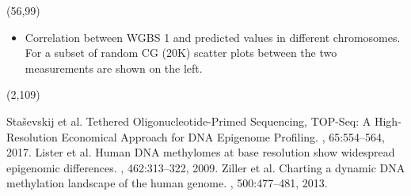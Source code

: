 \documentclass[a0,50pt]{a0poster}
\begin{document}
    \begin{textblock}{25}(56,99)
        \Large
        \begin{itemize}
            \item Correlation between WGBS 1 and predicted values in different chromosomes. For a subset of random CG (20K) scatter plots between the two measurements are shown on the left.
        \end{itemize}
    \end{textblock}


    \begin{textblock}{22}(2,109)
        \renewcommand{\section}[2]{}
        \begin{thebibliography}{}
                Staševskij et al.
                \newblock Tethered Oligonucleotide-Primed Sequencing, TOP-Seq: A High-Resolution Economical Approach for DNA Epigenome Profiling.
                , 65:554--564, 2017.
                Lister et al.
                \newblock Human DNA methylomes at base resolution show widespread epigenomic differences.
                , 462:313--322, 2009.
                Ziller et al.
                \newblock Charting a dynamic DNA methylation landscape of the human genome.
                , 500:477--481, 2013.

        \end{thebibliography}
    \end{textblock}
\end{document}
